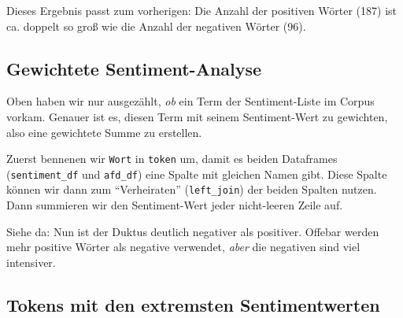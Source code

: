 \documentclass[12pt,]{book}
\makeatletter
\newenvironment{Shaded}{\begin{snugshade}}{\end{snugshade}}
\newcommand{\KeywordTok}[1]{\textcolor[rgb]{0.13,0.29,0.53}{\textbf{{#1}}}}
\newcommand{\DataTypeTok}[1]{\textcolor[rgb]{0.13,0.29,0.53}{{#1}}}
\newcommand{\StringTok}[1]{\textcolor[rgb]{0.31,0.60,0.02}{{#1}}}
\newcommand{\CommentTok}[1]{\textcolor[rgb]{0.56,0.35,0.01}{\textit{{#1}}}}
\newcommand{\OtherTok}[1]{\textcolor[rgb]{0.56,0.35,0.01}{{#1}}}
\newcommand{\NormalTok}[1]{{#1}}
\newenvironment{kframe}{%
\medskip{}
\setlength{\fboxsep}{.8em}
 \def\at@end@of@kframe{}%
 \ifinner\ifhmode%
  \def\at@end@of@kframe{\end{minipage}}%
  \begin{minipage}{\columnwidth}%
 \fi\fi%
 \def\FrameCommand##1{\hskip\@totalleftmargin \hskip-\fboxsep
 \colorbox{shadecolor}{##1}\hskip-\fboxsep
     \hskip-\linewidth \hskip-\@totalleftmargin \hskip\columnwidth}%
 \MakeFramed {\advance\hsize-\width
   \@totalleftmargin\z@ \linewidth\hsize
   \@setminipage}}%
 {\par\unskip\endMakeFramed%
 \at@end@of@kframe}
\renewenvironment{Shaded}{\begin{kframe}}{\end{kframe}}
\makeatother
\begin{document}
Dieses Ergebnis passt zum vorherigen: Die Anzahl der positiven Wörter
(187) ist ca. doppelt so groß wie die Anzahl der negativen Wörter (96).

\subsection{Gewichtete
Sentiment-Analyse}\label{gewichtete-sentiment-analyse}

Oben haben wir nur ausgezählt, \emph{ob} ein Term der Sentiment-Liste im
Corpus vorkam. Genauer ist es, diesen Term mit seinem Sentiment-Wert zu
gewichten, also eine gewichtete Summe zu erstellen.

\begin{Shaded}
\end{Shaded}

Zuerst bennenen wir \texttt{Wort} in \texttt{token} um, damit es beiden
Dataframes (\texttt{sentiment\_df} und \texttt{afd\_df}) eine Spalte mit
gleichen Namen gibt. Diese Spalte können wir dann zum ``Verheiraten''
(\texttt{left\_join}) der beiden Spalten nutzen. Dann summieren wir den
Sentiment-Wert jeder nicht-leeren Zeile auf.

Siehe da: Nun ist der Duktus deutlich negativer als positiver. Offebar
werden mehr positive Wörter als negative verwendet, \emph{aber} die
negativen sind viel intensiver.

\subsection{Tokens mit den extremsten
Sentimentwerten}\label{tokens-mit-den-extremsten-sentimentwerten}
\end{document}
